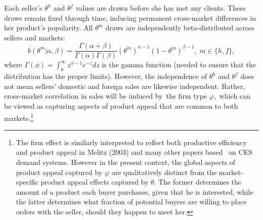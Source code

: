 \documentclass[12pt]{article}
\begin{document}
Each seller's $\theta ^{h}$ and $\theta ^{f}$ values are drawn before she
has met any clients. These draws remain fixed through time, inducing
permanent cross-market differences in her product's popularity. All $\theta
^{m}$ draws are independently beta-distributed across sellers and markets:%
\begin{equation*}
b(\theta ^{m}|\alpha ,\beta )=\frac{\Gamma (\alpha +\beta )}{\Gamma (\alpha
)\Gamma (\beta )}\left( \theta ^{m}\right) ^{\alpha -1}(1-\theta
^{m})^{\beta -1},\;m\in \{h,f\},
\end{equation*}%
where $\Gamma (\phi )=\int_{0}^{\infty }z^{\phi -1}e^{-z}dz$ is the gamma
function (needed to ensure that the distribution has the proper limits).
However, the independence of $\theta ^{h}$ and $\theta ^{f}$ does not mean
sellers' domestic and foreign sales are likewise independent. Rather,
cross-market correlation in sales will be induced by\ the firm type $\varphi
,$ which can be viewed as capturing aspects of product appeal that are
common to both markets$.$\footnote{%
The firm effect is similarly interpreted to reflect both productive
efficiency and product appeal in Melitz (2003) and many other papers based \
on CES demand systems. However in the present context, the global aspects of
product appeal captured by $\varphi $ are qualitatively distinct from the
market-specific product appeal effects captured by $\theta $. The former
determines the amount of a product each buyer purchases, given that he is
interested, while the latter determines what fraction of potential buyers
are willing to place orders with the seller, should they happen to meet
her.\medskip}
\end{document}

